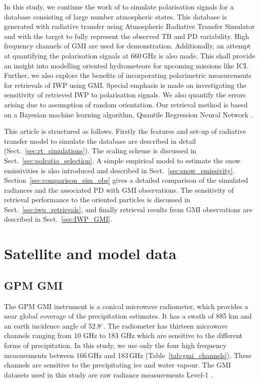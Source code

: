 \documentclass[amt, manuscript]{copernicus}
\begin{document}
In this study, we continue the work of \citet{barlakas:intro:21} to simulate polarisation signals for a database consisting of large number atmospheric states. This database is generated with radiative transfer using Atmospheric Radiative Transfer Simulator \citep[ARTS,][]{eriksson:arts2:11} and with the target to fully represent the observed TB and PD variability. High frequency channels of GMI are used for demonstration. Additionally, an attempt at quantifying the polarisation signals at 660\,GHz is also made. This shall provide an insight into modelling oriented hydrometeors for upcoming missions like ICI. Further, we also explore the benefits of incorporating polarimetric measurements for retrievals of IWP using GMI. Special emphasis is made on investigating the sensitivity of retrieved IWP to polarisation signals. We also quantify the errors arising due to assumption of random orientation. Our retrieval method is based on a Bayesian machine learning algorithm, Quantile Regression Neural Network  \citep[QRNN][]{pfreundschuh:aneur:18}. 

This article is structured as follows. Firstly the features and set-up of radiative transfer model to simulate the database are described in detail (Sect.~\ref{sec:rt_simulations}). The scaling scheme is discussed in Sect.~\ref{sec:polratio_selection}. A simple empirical model to estimate the snow emissivities is also introduced and described in Sect.~\ref{sec:snow_emissivity}. Section~\ref{sec:comparison_sim_obs} gives a detailed comparison of the simulated radiances and the associated PD with GMI observations. The sensitivity of retrieval performance to the oriented particles is discussed in Sect.~\ref{sec:iwp_retrievals}, and finally retrieval results from GMI observations are described in Sect.~\ref{sec:IWP_GMI}.

  


\section{Satellite and model data}
\label{sec:data}
\subsection{GPM GMI}

The GPM GMI instrument is a conical microwave radiometer, which provides a near global coverage of the precipitation estimates. It has a swath of 885\,\,km  and an earth incidence angle of 52.8$^{\circ}$. The radiometer has thirteen microwave channels ranging from 10\,\,GHz to 183\,\,GHz which are sensitive to the different forms of precipitation. In this study, we use only the four high frequency measurements between 166\,GHz and 183\,GHz (Table~\ref{tab:gmi_channels}). These channels are sensitive to the precipitating ice and water vapour. The GMI datasets used in this study are raw radiance measurements Level-1 \citep[L1B,][]{gpm:16}. 
\end{document}
